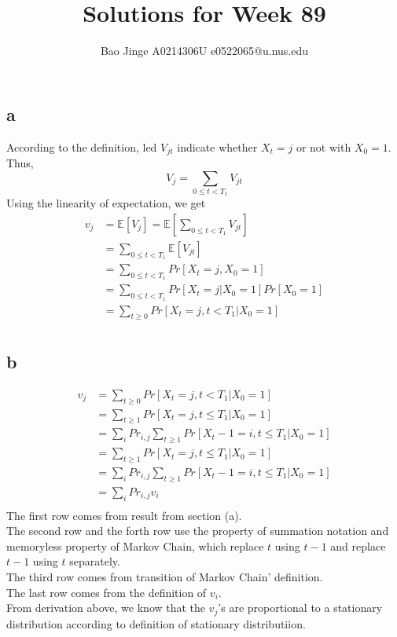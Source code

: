 \documentclass{article}
\author{Bao Jinge A0214306U e0522065@u.nus.edu}
\title{Solutions for Week 89}
\date{}
\begin{document}
	\maketitle
	\section{}
	\subsection{a}
	According to the definition, led $V_{jt}$ indicate whether $X_t=j$ or not with $X_0=1$. Thus,
	$$
	V_j = \sum_{0 \leq t < T_1}V_{jt}
	$$
	Using the linearity of expectation, we get
	$$
	\begin{aligned}
	v_j &= \mathbb{E}[V_j]= \mathbb{E}[\sum_{0 \leq t < T_1}V_{jt}]\\
		&= \sum_{0 \leq t < T_1}\mathbb{E}[V_{jt}]\\
		&= \sum_{0 \leq t < T_1}Pr[X_t=j, X_0=1]\\
		&= \sum_{0 \leq t < T_1}Pr[X_t=j| X_0=1] Pr[X_0=1]\\
		&= \sum_{t \geq 0}Pr[X_t=j, t < T_1|X_0=1]\\
	\end{aligned}
	$$
	\subsection{b}
	$$
	\begin{aligned}
	v_j &= \sum_{t \geq 0}Pr[X_t=j,t<T_1|X_0=1]\\
		&= \sum_{t \geq 1}Pr[X_t=j,t\leq T_1|X_0=1]\\
		&= \sum_{i}Pr_{i,j}\sum_{t \geq 1}Pr[X_t-1=i,t\leq T_1|X_0=1]\\
		&= \sum_{t \geq 1}Pr[X_t=j,t\leq T_1|X_0=1]\\
		&= \sum_{i}Pr_{i,j}\sum_{t \geq 1}Pr[X_t-1=i,t\leq T_1|X_0=1]\\
		&= \sum_{i}Pr_{i,j}v_i\\
	\end{aligned}
	$$
	The first row comes from result from section (a).\\
	The second row and the forth row use the property of summation notation and memoryless property of Markov Chain, which replace $t$ using $t-1$ and replace $t-1$ using $t$ separately.\\
	The third row comes from transition of Markov Chain' definition.\\
	The last row comes from the definition of $v_i$.\\
	From derivation above, we know that the $v_j$'s are proportional to a stationary distribution according to definition of stationary distributiion.\\
\end{document}
